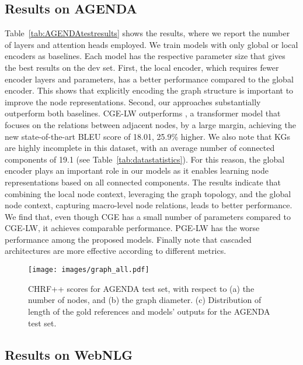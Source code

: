 \documentclass[11pt,a4paper]{article}
\begin{document}
\subsection{Results on AGENDA}
Table~\ref{tab:AGENDAtestresults} shows the results, where we report the number of layers and attention heads employed. We train models with only global or local encoders as baselines. Each model has the respective parameter size that gives the best results on the dev set. First, the local encoder, which requires fewer encoder layers and parameters, has a better performance compared to the global encoder. This shows that explicitly encoding the graph structure is important to improve the node representations. Second, our approaches substantially outperform both baselines. {\selectfont CGE-LW} outperforms \citet{koncel-kedziorski-etal-2019-text}, a transformer model that focuses on the relations between adjacent nodes, by a large margin, achieving the new state-of-the-art BLEU score of 18.01, 25.9\% higher. We also note that KGs are highly incomplete in this dataset, with an average number of connected components of 19.1 (see Table~\ref{tab:datastatistics}). For this reason, the global encoder plays an important role in our models as it enables learning node representations based on all connected components. The results indicate that combining the local node context, leveraging the graph topology, and the global node context, capturing macro-level node relations, leads to better performance. We find that, even though {\selectfont CGE} has a small number of parameters compared to {\selectfont CGE-LW}, it achieves comparable performance. {\selectfont PGE-LW} has the worse performance among the proposed models. Finally note that cascaded architectures are more effective according to different metrics. 


 \begin{figure*}[t]
    \centering
    \texttt{[image: images/graph\_all.pdf]}
    \vspace{-7mm}
    \caption{CHRF++ scores for AGENDA test set, with respect to (a) the number of nodes, and (b) the graph diameter. (c) Distribution of length of the gold references and models' outputs for the AGENDA test set.}
    \label{fig:analysis1}
\end{figure*}






\subsection{Results on WebNLG}
\end{document}
